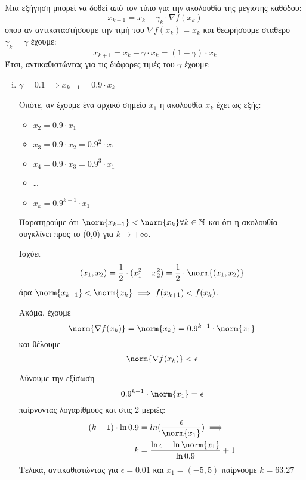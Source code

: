 \hfill \break
\hfill \break
\noindent Μια εξήγηση μπορεί να δοθεί από τον τύπο για την ακολουθία της μεγίστης καθόδου: 
\begin{equation}
	x_{k + 1} = x_k - \gamma_k \cdot \nabla f(x_k) 
\end{equation}
όπου αν αντικαταστήσουμε την τιμή του $\nabla f(x_k) = x_k$ και θεωρήσουμε σταθερό $\gamma_k = \gamma$ έχουμε:
\begin{equation}
	x_{k + 1} = x_k - \gamma \cdot x_k = (1- \gamma) \cdot x_k
\end{equation}
\hfill \break
\noindent Έτσι, αντικαθιστώντας για τις διάφορες τιμές του $\gamma$ έχουμε:
\begin{enumerate}[i)]
	\item $\gamma = 0.1 \implies x_{k + 1} = 0.9 \cdot x_k$
	
	Οπότε, αν έχουμε ένα αρχικό σημείο $x_1$ η ακολουθία $x_k$ έχει ως εξής:
	\begin{itemize}
		\item $x_2 = 0.9 \cdot x_1$
		\item $x_3 = 0.9 \cdot x_2 = 0.9^2 \cdot x_1$
		\item $x_4 = 0.9 \cdot x_3 = 0.9^3 \cdot x_1$
		\item \ldots
		\item $x_k = 0.9^{k-1} \cdot x_1$
	\end{itemize}
	
	Παρατηρούμε ότι $\norm{x_{k+1}} < \norm{x_{k}} \forall k \in \mathbb{N}$ και ότι η ακολουθία συγκλίνει προς το (0,0) για $k \to +\infty$.
	
	Ισχύει
	\begin{equation}
		(x_1, x_2) = \frac{1}{2} \cdot (x_1^2 + x_2^2) = \frac{1}{2} \cdot \norm{(x_1, x_2)}
	\end{equation} άρα	$\norm{x_{k+1}} < \norm{x_{k}} \implies f(x_{k+1}) < f(x_k)$.
	
	Ακόμα, έχουμε 
	\begin{equation}
		\norm{\nabla f(x_k)} = \norm{x_k} = 0.9^{k-1} \cdot \norm{x_1}
	\end{equation}
	και θέλουμε 
	\begin{equation}
		\label{eq:while_termination}
		\norm{\nabla f(x_k)} < \epsilon
	\end{equation}
	
	Λύνουμε την εξίσωση \[ 0.9^{k-1} \cdot \norm{x_1} = \epsilon \] 
	παίρνοντας λογαρίθμους και στις 2 μεριές: 
	\begin{align*}
		 (k - 1) \cdot \ln 0.9 &= ln(\frac{\epsilon}{\norm{x_1}}) \implies \\
		 k &= \frac{\ln \epsilon - \ln  \norm{x_1}}{\ln 0.9} + 1
	\end{align*}
	Τελικά, αντικαθιστώντας για $\epsilon = 0.01$ και $x_1 = (-5, 5)$ παίρνουμε $k = 63.27$
	

\end{enumerate}
